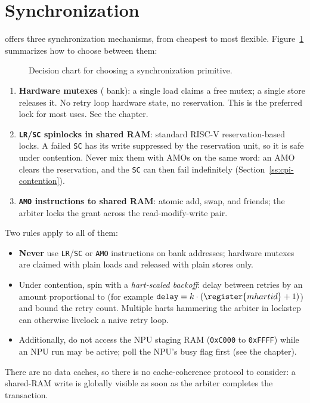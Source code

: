 \section{Synchronization} \label{ss:multicore-sync}

\AsicNameForUserGuide{} offers three synchronization mechanisms, from cheapest to most flexible. Figure~\ref{fig:sync-decision} summarizes how to choose between them:

\begin{figure}[h]
	\centering
	
	\caption{Decision chart for choosing a synchronization primitive.}
	\label{fig:sync-decision}
\end{figure}

\begin{enumerate}
	\item \textbf{Hardware mutexes} ( bank): a single load claims a free mutex; a single store releases it. No retry loop hardware state, no reservation. This is the preferred lock for most uses. See the  chapter.
	\item \textbf{\texttt{LR}/\texttt{SC} spinlocks in shared RAM}: standard RISC-V reservation-based locks. A failed \texttt{SC} has its write suppressed by the reservation unit, so it is safe under contention. Never mix them with AMOs on the same word: an AMO clears the reservation, and the \texttt{SC} can then fail indefinitely\ifnum{} (Section~\ref{ss:cpi-contention})\fi.
	\item \textbf{\texttt{AMO} instructions to shared RAM}: atomic add, swap, and friends; the arbiter locks the grant across the read-modify-write pair.
\end{enumerate}

Two rules apply to all of them:

\begin{itemize}
	\item \textbf{Never} use \texttt{LR}/\texttt{SC} or \texttt{AMO} instructions on  bank addresses; hardware mutexes are claimed with plain loads and released with plain stores only.
	\item Under contention, spin with a \textit{hart-scaled backoff}: delay between retries by an amount proportional to  (for example $\mathtt{delay} = k \cdot (\register{mhartid} + 1)$) and bound the retry count. Multiple harts hammering the arbiter in lockstep can otherwise livelock a naive retry loop.
	\ifnpupresent\item Additionally, do not access the NPU staging RAM (\texttt{0xC000} to \texttt{0xFFFF}) while an NPU run may be active; poll the NPU's busy flag first (see the  chapter).\fi
\end{itemize}

There are no data caches, so there is no cache-coherence protocol to consider: a shared-RAM write is globally visible as soon as the arbiter completes the transaction.
